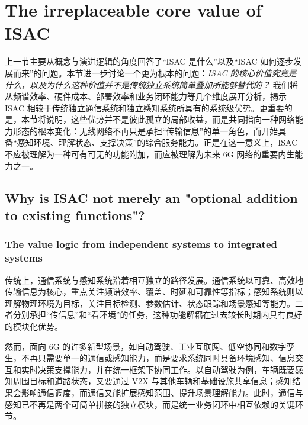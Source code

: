 
\section{The irreplaceable core value of ISAC}
\label{sec:ch1-isac-core-value}


上一节主要从概念与演进逻辑的角度回答了“ISAC 是什么”以及“ISAC 如何逐步发展而来”的问题。本节进一步讨论一个更为根本的问题：\emph{ISAC 的核心价值究竟是什么，以及为什么这种价值并不是传统独立系统简单叠加所能够替代的？} 我们将从频谱效率、硬件成本、部署效率和业务闭环能力等几个维度展开分析，揭示 ISAC 相较于传统独立通信系统和独立感知系统所具有的系统级优势。更重要的是，本节将说明，这些优势并不是彼此孤立的局部收益，而是共同指向一种网络能力形态的根本变化：无线网络不再只是承担“传输信息”的单一角色，而开始具备“感知环境、理解状态、支撑决策”的综合服务能力\cite{Liu2022ISAC,Gonzalez2024integrated,Saad2020Vision6G}。正是在这一意义上，ISAC 不应被理解为一种可有可无的功能附加，而应被理解为未来 6G 网络的重要内生能力之一。

\subsection{Why is ISAC not merely an "optional addition to existing functions"?}
\label{subsec:ch1-isac-core-value-why}
\subsubsection{The value logic from independent systems to integrated systems}
\label{subsubsec:ch1-isac-core-value-logic}

传统上，通信系统与感知系统沿着相互独立的路径发展。通信系统以可靠、高效地传输信息为核心，重点关注频谱效率、覆盖、时延和可靠性等指标\cite{Goldsmith2005}；感知系统则以理解物理环境为目标，关注目标检测、参数估计、状态跟踪和场景感知等能力\cite{SkolnikRadarBook}。二者分别承担“传信息”和“看环境”的任务，这种功能解耦在过去较长时期内具有良好的模块化优势。

然而，面向 6G 的许多新型场景，如自动驾驶、工业互联网、低空协同和数字孪生，不再只需要单一的通信或感知能力，而是要求系统同时具备环境感知、信息交互和实时决策支撑能力，并在统一框架下协同工作\cite{Saad2020Vision6G,Gonzalez2024integrated,IMT2030Framework}。以自动驾驶为例，车辆既要感知周围目标和道路状态，又要通过 V2X 与其他车辆和基础设施共享信息；感知结果会影响通信调度，而通信又能扩展感知范围、提升场景理解能力\cite{Zhang2020perceptive}。此时，通信与感知已不再是两个可简单拼接的独立模块，而是统一业务闭环中相互依赖的关键环节。

